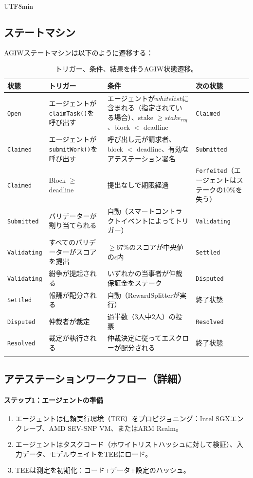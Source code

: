 \documentclass[11pt]{article}
\begin{document}
\begin{CJK}{UTF8}{min}
\subsection{ステートマシン}
\label{sec:agiw-state-machine}
AGIWステートマシンは以下のように遷移する：
\begin{longtable}{@{}p{}p{}p{}p{}@{}}
\toprule
\textbf{状態} & \textbf{トリガー} & \textbf{条件} & \textbf{次の状態} \\\midrule
\texttt{Open} & エージェントが\texttt{claimTask()}を呼び出す & エージェントが$whitelist$に含まれる（指定されている場合）、stake $\geq stake_{req}$、block $<$ deadline & \texttt{Claimed} \\
\texttt{Claimed} & エージェントが\texttt{submitWork()}を呼び出す & 呼び出し元が請求者、block $<$ deadline、有効なアテステーション署名 & \texttt{Submitted} \\
\texttt{Claimed} & Block $\geq$ deadline & 提出なしで期限経過 & \texttt{Forfeited}（エージェントはステークの10\%を失う） \\
\texttt{Submitted} & バリデーターが割り当てられる & 自動（スマートコントラクトイベントによってトリガー） & \texttt{Validating} \\
\texttt{Validating} & すべてのバリデーターがスコアを提出 & $\geq 67\%$のスコアが中央値の$\epsilon$内 & \texttt{Settled} \\
\texttt{Validating} & 紛争が提起される & いずれかの当事者が仲裁保証金をステーク & \texttt{Disputed} \\
\texttt{Settled} & 報酬が配分される & 自動（RewardSplitterが実行） & 終了状態 \\
\texttt{Disputed} & 仲裁者が裁定 & 過半数（3人中2人）の投票 & \texttt{Resolved} \\
\texttt{Resolved} & 裁定が執行される & 仲裁決定に従ってエスクローが配分される & 終了状態 \\\bottomrule
\caption{トリガー、条件、結果を伴うAGIW状態遷移。}
\label{tab:agiw-states}
\end{longtable}

\subsection{アテステーションワークフロー（詳細）}
\label{sec:attestation-workflow}
\paragraph{ステップ1：エージェントの準備}
\begin{enumerate}[noitemsep]
  \item エージェントは信頼実行環境（TEE）をプロビジョニング：Intel SGXエンクレーブ、AMD SEV-SNP VM、またはARM Realm。
  \item エージェントはタスクコード（ホワイトリストハッシュに対して検証）、入力データ、モデルウェイトをTEEにロード。
  \item TEEは測定を初期化：コード+データ+設定のハッシュ。
\end{enumerate}


\end{CJK}
\end{document}
